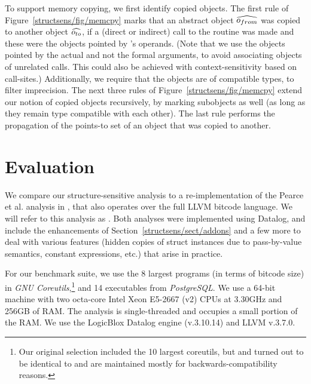 To support memory copying, we first identify copied objects. The first
rule of Figure~\ref{structsens/fig/memcpy} marks that an abstract
object \(\widehat{o_{from}}\) was copied to another object
\(\widehat{o_{to}}\), if a (direct or indirect) call to the
 routine was made and these were the objects pointed by
's operands. (Note that we use the objects pointed by
the actual and not the formal arguments, to avoid associating objects
of unrelated  calls. This could also be achieved with
context-sensitivity based on call-sites.) Additionally, we require
that the objects are of compatible types, to filter imprecision. The
next three rules of Figure~\ref{structsens/fig/memcpy} extend our
notion of copied objects recursively, by marking subobjects as well
(as long as they remain type compatible with each other). The last rule
performs the propagation of the points-to set of an object that was
copied to another.


\section{Evaluation}
\label{structsens/sect/eval}

We compare our structure-sensitive analysis to a re-implementation of
the Pearce et al. \cite{paste/PearceKH04,toplas/PearceKH07} analysis
in \cclyzer{}, that also operates over the full LLVM bitcode
language. We will refer to this analysis as \pearce{}. Both analyses
were implemented using Datalog, and include the enhancements of
Section~\ref{structsens/sect/addons} and a few more to deal with
various features (hidden copies of struct instances due to
pass-by-value semantics, constant expressions, etc.) that arise in
practice.

%
For our benchmark suite, we use the 8 largest programs (in terms of
bitcode size) in \emph{GNU Coreutils},\footnote{Our original selection
  included the 10 largest coreutils, but  and 
  turned out to be identical to  and are maintained mostly
  for backwards-compatibility reasons.}  and 14 executables from
\emph{PostgreSQL}. We use a 64-bit machine with two octa-core Intel
Xeon E5-2667 (v2) CPUs at 3.30GHz and 256GB of RAM. The analysis
is single-threaded and occupies a small portion of the RAM. We use
the LogicBlox Datalog engine (v.3.10.14) and LLVM v.3.7.0.


